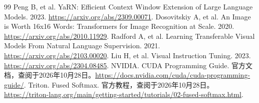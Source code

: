 \documentclass[UTF8,12pt,a4paper,fontset=fandol]{ctexbook}
\begin{document}
\begin{thebibliography}{99}
 Peng B, et al. YaRN: Efficient Context Window Extension of Large Language Models. 2023. \url{https://arxiv.org/abs/2309.00071}.
 Dosovitskiy A, et al. An Image is Worth 16x16 Words: Transformers for Image Recognition at Scale. 2020. \url{https://arxiv.org/abs/2010.11929}.
 Radford A, et al. Learning Transferable Visual Models From Natural Language Supervision. 2021. \url{https://arxiv.org/abs/2103.00020}.
 Liu H, et al. Visual Instruction Tuning. 2023. \url{https://arxiv.org/abs/2304.08485}.
 NVIDIA. CUDA Programming Guide. 官方文档，查阅于2026年10月28日。\url{https://docs.nvidia.com/cuda/cuda-programming-guide/}.
 Triton. Fused Softmax. 官方教程，查阅于2026年10月28日。\url{https://triton-lang.org/main/getting-started/tutorials/02-fused-softmax.html}.

\end{thebibliography}
\end{document}

